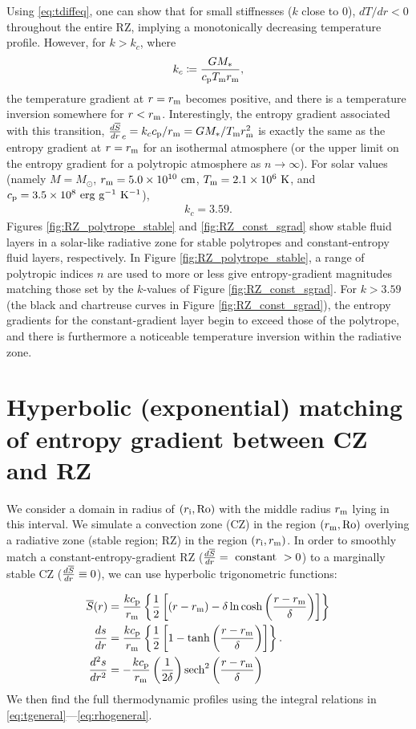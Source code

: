 \documentclass[12pt]{article} %
\newcommand{\rrm}{r_{\rm{m}}}
\newcommand{\ri}{r_{\rm{i}}}
\begin{document}
Using \eqref{eq:tdiffeq}, one can show that for small stiffnesses ($k$ close to $0$), $dT/dr < 0$ throughout the entire RZ, implying a monotonically decreasing temperature profile. However, for $k>k_c$, where
\begin{align}
k_c\coloneqq \frac{G\mstar}{\cp T_{\rm{m}}\rrm},
\end{align}
the temperature gradient at $r=\rrm$ becomes positive, and there is a temperature inversion somewhere for $r<\rrm$. Interestingly, the entropy gradient associated with this transition, $\dsdr_c=k_c\cp/\rrm=G\mstar/T_{\rm{m}}\rrm^2$ is exactly the same as the entropy gradient at $r=\rrm$ for an isothermal atmosphere (or the upper limit on the entropy gradient for a polytropic atmosphere as $n\rightarrow\infty$). For solar values (namely $M=M_\odot$, $\rrm = 5.0\times10^{10}\ \rm{cm}$, $T_{\rm{m}} = 2.1\times10^6\ \rm{K}$, and $\cp=3.5\times10^8\ \rm{erg\ g^{-1}\ K^{-1}}$),
\begin{align}
k_c = 3.59.
\label{eq:kc_solar}
\end{align}
Figures \ref{fig:RZ_polytrope_stable} and \ref{fig:RZ_const_sgrad} show stable fluid layers in a solar-like radiative zone for stable polytropes and constant-entropy fluid layers, respectively. In Figure \ref{fig:RZ_polytrope_stable}, a range of polytropic indices $n$ are used to more or less give entropy-gradient magnitudes matching those set by the $k$-values of Figure \ref{fig:RZ_const_sgrad}. For $k>3.59$ (the black and chartreuse curves in Figure \ref{fig:RZ_const_sgrad}), the entropy gradients for the constant-gradient layer begin to exceed those of the polytrope, and there is furthermore a noticeable temperature inversion within the radiative zone.

\section{Hyperbolic (exponential)  matching of entropy gradient between CZ and RZ}
We consider a domain in radius of $(\ri,\ro)$ with the middle radius $\rrm$ lying in this interval. We simulate a convection zone (CZ) in the region $(\rrm, \ro)$ overlying a radiative zone (stable region; RZ) in the region $(\ri,\rrm)$. In order to smoothly match a constant-entropy-gradient RZ ($\frac{d\overline{S}}{dr}=\ \rm{constant}\ > 0$) to a marginally stable CZ ($\frac{d\overline{S}}{dr}\equiv 0$), we can use hyperbolic trigonometric functions:

\begin{align}
\sref\ofr &= \frac{k\cp}{\rrm}\left\{\frac{1}{2}\left[(r-\rrm) -\delta\ln\cosh{\left(\frac{r-\rrm}{\delta}\right)}\right]\right\}\label{eq:s_tanh_transition}\\
\frac{ds}{dr} &= \frac{k\cp}{\rrm}\left\{\frac{1}{2}\left[1 - \tanh{\left(\frac{r-\rrm}{\delta}\right)}\right]\right\}.\label{eq:dsdr_tanh_transition}\\
\frac{d^2s}{dr^2} &= -\frac{k\cp}{\rrm}\left(\frac{1}{2\delta}\right){\rm{sech}}^2\left(\frac{r-\rrm}{\delta}\right)
\end{align}
We then find the full thermodynamic profiles using the integral relations in \eqref{eq:tgeneral}---\eqref{eq:rhogeneral}.
\end{document}
